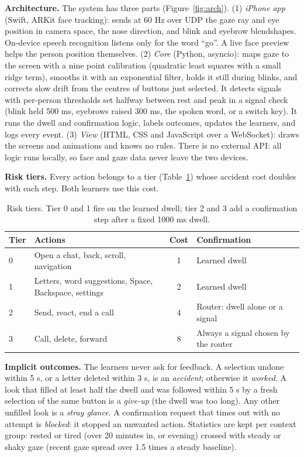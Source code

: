 \documentclass[manuscript,review]{acmart}
\begin{document}
\textbf{Architecture.} The system has three parts (Figure~\ref{fig:arch}).
(1) \emph{iPhone app} (Swift, ARKit face tracking): sends at 60 Hz over UDP the gaze ray and eye
position in camera space, the nose direction, and blink and eyebrow blendshapes. On-device speech
recognition listens only for the word ``go''. A live face preview helps the person position
themselves. (2) \emph{Core} (Python, asyncio): maps gaze to the screen with a nine point
calibration (quadratic least squares with a small ridge term), smooths it with an exponential
filter, holds it still during blinks, and corrects slow drift from the centres of buttons just
selected. It detects signals with per-person thresholds set halfway between rest and peak in a
signal check (blink held 500 ms, eyebrows raised 300 ms, the spoken word, or a switch key). It
runs the dwell and confirmation logic, labels outcomes, updates the learners, and logs every
event. (3) \emph{View} (HTML, CSS and JavaScript over a WebSocket): draws the screens and
animations and knows no rules. There is no external API: all logic runs locally, so face and gaze
data never leave the two devices.

\textbf{Risk tiers.} Every action belongs to a tier (Table~\ref{tab:tiers}) whose accident cost
doubles with each step. Both learners use this cost.

\begin{table}[t]
  \caption{Risk tiers. Tier 0 and 1 fire on the learned dwell; tier 2 and 3 add a confirmation
  step after a fixed 1000 ms dwell.}
  \label{tab:tiers}
  \small
  \begin{tabular}{llcl}
    \toprule
    Tier & Actions & Cost & Confirmation \\
    \midrule
    0 & Open a chat, back, scroll, navigation & 1 & Learned dwell \\
    1 & Letters, word suggestions, Space, Backspace, settings & 2 & Learned dwell \\
    2 & Send, react, end a call & 4 & Router: dwell alone or a signal \\
    3 & Call, delete, forward & 8 & Always a signal chosen by the router \\
    \bottomrule
  \end{tabular}
\end{table}

\textbf{Implicit outcomes.} The learners never ask for feedback. A selection undone within 5 s, or
a letter deleted within 3 s, is an \emph{accident}; otherwise it \emph{worked}. A look that filled
at least half the dwell and was followed within 5 s by a fresh selection of the same button is a
\emph{give-up} (the dwell was too long). Any other unfilled look is a \emph{stray glance}. A
confirmation request that times out with no attempt is \emph{blocked}: it stopped an unwanted
action. Statistics are kept per context group: rested or tired (over 20 minutes in, or evening)
crossed with steady or shaky gaze (recent gaze spread over 1.5 times a steady baseline).
\end{document}
